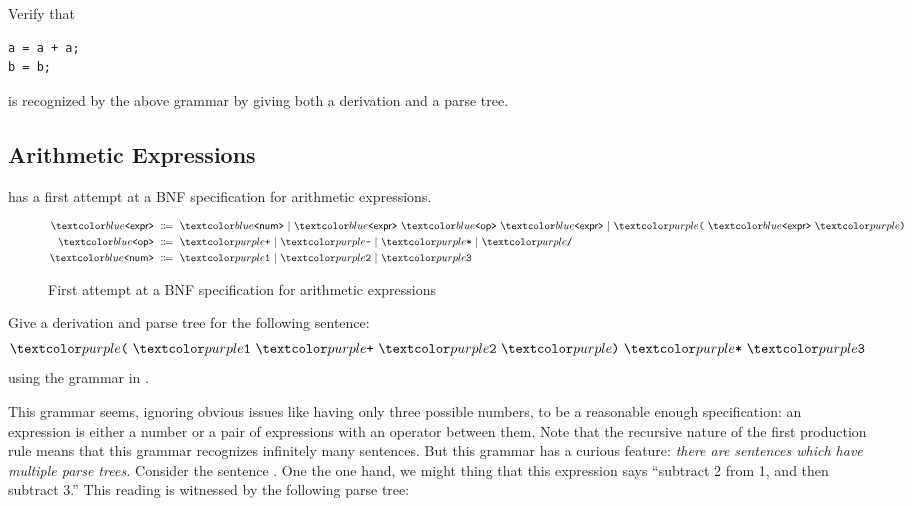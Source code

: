 \begin{exercise}
Verify that
\begin{lstlisting}
a = a + a;
b = b;
\end{lstlisting}
is recognized by the above grammar by giving both a derivation and a parse tree.
\end{exercise}

\subsection*{Arithmetic Expressions}

 has a first attempt at a BNF specification for arithmetic expressions.

\begin{figure}
  \begin{align*}
    \bnfnt{expr} &\bnfeq
    \bnfnt{num} \bnfalt
    \bnfnt{expr} \ \bnfnt{op} \ \bnfnt{expr} \bnfalt
    \bnft{(} \ \bnfnt{expr} \ \bnft{)} \\
    \bnfnt{op} &\bnfeq \bnft{+} \bnfalt \bnft{-} \bnfalt \bnft{*} \bnfalt \bnft{/} \\
    \bnfnt{num} &\bnfeq \bnft{1} \bnfalt \bnft{2} \bnfalt \bnft{3}
  \end{align*}
  \caption{First attempt at a BNF specification for arithmetic expressions}
  \label{fig:arith-simple}
\end{figure}
%
\begin{exercise}
Give a derivation and parse tree for the following sentence:
%
\begin{align*}
\bnft{(} \ \bnft{1} \ \bnft{+} \ \bnft{2} \ \bnft{)} \ \bnft{*} \ \bnft{3}
\end{align*}
using the grammar in .
\end{exercise}
%
This grammar seems, ignoring obvious issues like having only three possible numbers, to be a reasonable enough specification: an expression is either a number or a pair of expressions with an operator between them.
Note that the recursive nature of the first production rule means that this grammar recognizes infinitely many sentences.
But this grammar has a curious feature: \textit{there are sentences which have multiple parse trees.}
Consider the sentence .
One the one hand, we might thing that this expression says \enquote{subtract 2 from 1, and then subtract 3.}
This reading is witnessed by the following parse tree:

